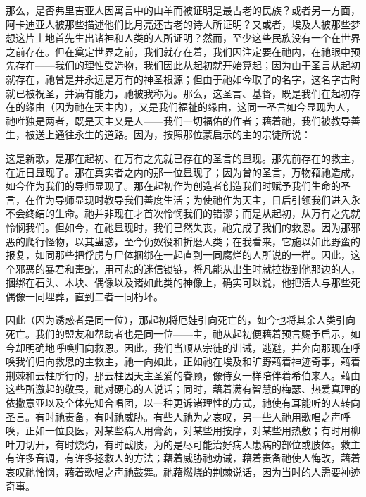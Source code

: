 那么，是否弗里吉亚人因寓言中的山羊而被证明是最古老的民族？或者另一方面，阿卡迪亚人被那些描述他们比月亮还古老的诗人所证明？又或者，埃及人被那些梦想这片土地首先生出诸神和人类的人所证明？然而，至少这些民族没有一个在世界之前存在。但在奠定世界之前，我们就存在着，我们因注定要在祂内，在祂眼中预先存在——我们的理性受造物，我们因此从起初就开始算起；因为由于圣言从起初就存在，祂曾是并永远是万有的神圣根源；但由于祂如今取了的名字，这名字古时就已被祝圣，并满有能力，祂被我称为。那么，这圣言、基督，既是我们在起初存在的缘由（因为祂在天主内），又是我们福祉的缘由，这同一圣言如今显现为人，祂唯独是两者，既是天主又是人——我们一切福佑的作者；藉着祂，我们被教导善生，被送上通往永生的道路。因为，按照那位蒙启示的主的宗徒所说：\par

这是新歌，是那在起初、在万有之先就已存在的圣言的显现。那先前存在的救主，在近日显现了。那在真实者之内的那一位显现了；因为曾的圣言，万物藉祂造成，如今作为我们的导师显现了。那在起初作为创造者创造我们时赋予我们生命的圣言，在作为导师显现时教导我们善度生活；为使祂作为天主，日后引领我们进入永不会终结的生命。祂并非现在才首次怜悯我们的错谬；而是从起初，从万有之先就怜悯我们。但如今，在祂显现时，我们已然失丧，祂完成了我们的救恩。因为那邪恶的爬行怪物，以其蛊惑，至今仍奴役和折磨人类；在我看来，它施以如此野蛮的报复，如同那些把俘虏与尸体捆绑在一起直到一同腐烂的人所说的一样。因此，这个邪恶的暴君和毒蛇，用可悲的迷信锁链，将凡能从出生时就拉拢到他那边的人，捆绑在石头、木块、偶像以及诸如此类的神像上，确实可以说，他把活人与那些死偶像一同埋葬，直到二者一同朽坏。\par

因此（因为诱惑者是同一位），那起初将厄娃引向死亡的，如今也将其余人类引向死亡。我们的盟友和帮助者也是同一位——主，祂从起初便藉着预言赐予启示，如今却明确地呼唤归向救恩。因此，我们当顺从宗徒的训诫，逃避，并奔向那现在呼唤我们归向救恩的主救主，祂一向如此，正如祂在埃及和旷野藉着神迹奇事，藉着荆棘和云柱所行的，那云柱因天主圣爱的眷顾，像侍女一样陪伴着希伯来人。藉由这些所激起的敬畏，祂对硬心的人说话；同时，藉着满有智慧的梅瑟、热爱真理的依撒意亚以及全体先知合唱团，以一种更诉诸理性的方式，祂使有耳能听的人转向圣言。有时祂责备，有时祂威胁。有些人祂为之哀叹，另一些人祂用歌唱之声呼唤，正如一位良医，对某些病人用膏药，对某些用按摩，对某些用热敷；有时用柳叶刀切开，有时烧灼，有时截肢，为的是尽可能治好病人患病的部位或肢体。救主有许多音调，有许多拯救人的方法；藉着威胁祂劝诫，藉着责备祂使人悔改，藉着哀叹祂怜悯，藉着歌唱之声祂鼓舞。祂藉燃烧的荆棘说话，因为当时的人需要神迹奇事。\par

